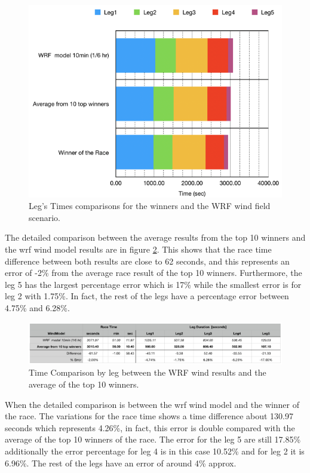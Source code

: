 \begin{figure}[hbt!] 
    \centering
    \includegraphics[width=0.6\linewidth]{images/TimesComparionsTop.png}
    \caption{Leg's Times comparisons for the winners and the WRF wind field scenario.}
    \label{fig:TimeTopComp}
\end{figure}

The detailed comparison between the average results from the top 10 winners and the \acrshort{wrf} wind model results are in figure \ref{fig:table10WinnerComp}. This shows that the race time difference between both results are close to 62 seconds, and this represents an error of -2\% from the average race result of the top 10 winners. Furthermore, the leg 5 has the largest percentage error which is 17\% while the smallest error is for leg 2 with 1.75\%. In fact, the rest of the legs have a percentage error  between 4.75\% and 6.28\%.

\begin{figure}[hbt!] 
    \centering
    \includegraphics[width=0.95\linewidth]{images/table_comp_W10winner.png}
    \caption{Time Comparison by leg between the WRF wind results and the average of the top 10 winners.}
    \label{fig:table10WinnerComp}
\end{figure}

When the detailed comparison is between the \acrshort{wrf} wind model and the winner of the race. The variations for the race time shows a time difference about 130.97 seconds which represents 4.26\%, in fact, this error is double compared with the average of the top 10 winners of the race. The error for the leg 5 are still 17.85\% additionally the error percentage for leg 4 is in this case 10.52\%  and for leg 2 it is 6.96\%. The rest of the legs have an error of around 4\% approx.\par  

